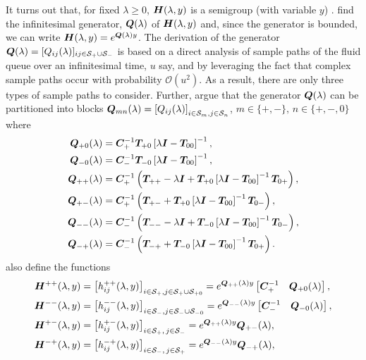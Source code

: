 It turns out that, for fixed \(\lambda \geq 0\), \(\boldsymbol H (\lambda,y)\) is a semigroup (with variable \(y\)) \citep{bean2005}. \cite{bean2005} find the infinitesimal generator, \(\boldsymbol Q(\lambda)\) of \(\boldsymbol H(\lambda,y)\) and, since the generator is bounded, we can write \(\boldsymbol H(\lambda,y)=e^{\boldsymbol Q(\lambda)y}\). The derivation of the generator \(\boldsymbol Q(\lambda)=[Q_{ij}(\lambda)]_{ij\in\mathcal{S}_+\cup\mathcal{S}_-}\) is based on a direct analysis of sample paths of the fluid queue over an infinitesimal time, \(u\) say, and by leveraging the fact that complex sample paths occur with probability \(\mathcal O(u^2)\). As a result, there are only three types of sample paths to consider. Further, \cite{bean2005} argue that the generator \(\boldsymbol Q(\lambda)\) can be partitioned into blocks \(\boldsymbol Q_{mn}(\lambda) = \left[Q_{ij}(\lambda)\right]_{i\in\mathcal{S}_m,j\in\mathcal{S}_n}\), \(m\in\{+,-\},\,n\in\{+,-,0\}\) where 
\begin{align*}
	\boldsymbol Q_{+0}(\lambda) &= \boldsymbol C_+^{-1}\boldsymbol T_{+0}\left[\lambda \boldsymbol I - \boldsymbol T_{00}\right]^{-1},
	\\\boldsymbol Q_{-0}(\lambda) &= \boldsymbol C_-^{-1}\boldsymbol T_{-0}\left[\lambda \boldsymbol I - \boldsymbol T_{00}\right]^{-1},
	\\\boldsymbol Q_{++}(\lambda) &= \boldsymbol C_+^{-1} \left(\boldsymbol T_{++} - \lambda \boldsymbol I + \boldsymbol T_{+0}\left[\lambda \boldsymbol I - \boldsymbol T_{00}\right]^{-1}\boldsymbol T_{0+}\right),
	\\\boldsymbol Q_{+-}(\lambda) &= \boldsymbol C_+^{-1} \left(\boldsymbol T_{+-} + \boldsymbol T_{+0}\left[\lambda \boldsymbol I - \boldsymbol T_{00}\right]^{-1}\boldsymbol T_{0-} \right) ,
	\\\boldsymbol Q_{--}(\lambda) &= \boldsymbol C_-^{-1} \left(\boldsymbol T_{--}  - \lambda \boldsymbol I + \boldsymbol T_{-0}\left[\lambda \boldsymbol I - \boldsymbol T_{00}\right]^{-1}\boldsymbol T_{0-}\right),
	\\\boldsymbol Q_{-+}(\lambda) &=\boldsymbol C_-^{-1} \left(\boldsymbol T_{-+}+ \boldsymbol T_{-0}\left[\lambda \boldsymbol I - \boldsymbol T_{00}\right]^{-1}\boldsymbol T_{0+}\right).
\end{align*}
\cite{bean2005} also define the functions 
\begin{align}
	\boldsymbol H^{++}(\lambda,y)&= \left[h_{ij}^{++}(\lambda,y)\right]_{i\in \mathcal S_+,j\in\mathcal S_{+}\cup\mathcal{S}_{+0}} = e^{\boldsymbol{Q}_{++}(\lambda)y}\begin{bmatrix} \boldsymbol C_+^{-1} & \boldsymbol Q_{+0}(\lambda) \end{bmatrix},  \label{eqn: lst 1a}
	\\\boldsymbol H^{--}(\lambda,y) &= \left[h_{ij}^{--}(\lambda,y)\right]_{i\in\mathcal S_-,j\in\mathcal S_{-}\cup\mathcal{S}_{-0}}= e^{\boldsymbol{Q}_{--}(\lambda)y}\begin{bmatrix} \boldsymbol C_-^{-1} & \boldsymbol Q_{-0}(\lambda) \end{bmatrix},
	\\\boldsymbol H^{+-}(\lambda,y)  &= \left[h_{ij}^{+-}(\lambda,y)\right]_{i\in\mathcal S_+,\,j\in\mathcal S_-}= e^{\boldsymbol{Q}_{++}(\lambda)y}\boldsymbol{Q}_{+-}(\lambda), 
	\\\boldsymbol H^{-+}(\lambda,y)&= \left[h_{ij}^{-+}(\lambda,y)\right]_{i\in\mathcal S_-,\, j\in\mathcal S_+} = e^{\boldsymbol{Q}_{--}(\lambda)y}\boldsymbol{Q}_{-+}(\lambda), \label{eqn: lst 4a}
\end{align}

